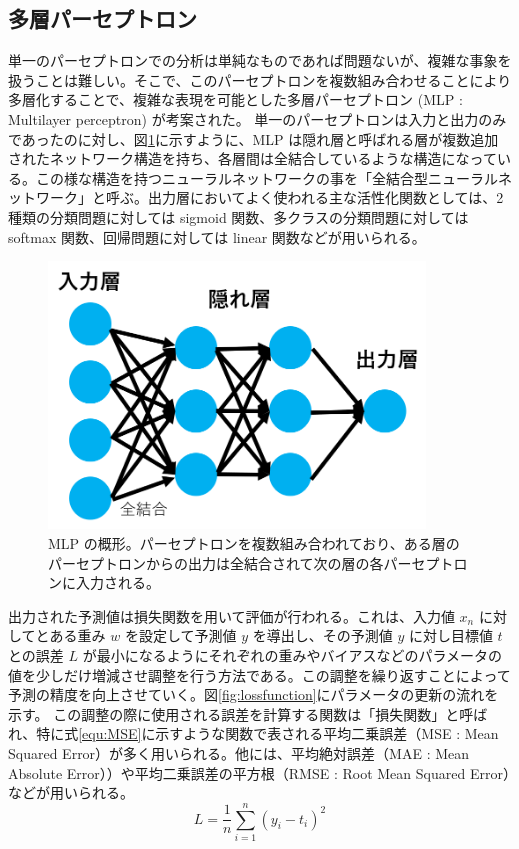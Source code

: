 \subsection{多層パーセプトロン}
単一のパーセプトロンでの分析は単純なものであれば問題ないが、複雑な事象を扱うことは難しい。そこで、このパーセプトロンを複数組み合わせることにより多層化することで、複雑な表現を可能とした多層パーセプトロン (MLP : Multilayer perceptron) が考案された。
単一のパーセプトロンは入力と出力のみであったのに対し、図\ref{fig:MLP}に示すように、MLP は隠れ層と呼ばれる層が複数追加されたネットワーク構造を持ち、各層間は全結合しているような構造になっている。この様な構造を持つニューラルネットワークの事を「全結合型ニューラルネットワーク」と呼ぶ。出力層においてよく使われる主な活性化関数としては、2種類の分類問題に対しては sigmoid 関数、多クラスの分類問題に対しては softmax 関数、回帰問題に対しては linear 関数などが用いられる。
\begin{figure}[tb]
  \centering
  \includegraphics[clip, width=10cm]{fig/4/MLP_re.png}
  \caption{MLP の概形。パーセプトロンを複数組み合われており、ある層のパーセプトロンからの出力は全結合されて次の層の各パーセプトロンに入力される。}
  \label{fig:MLP}
\end{figure}

出力された予測値は損失関数を用いて評価が行われる。これは、入力値 $x_n$ に対してとある重み $w$ を設定して予測値 $y$ を導出し、その予測値 $y$ に対し目標値 $t$ との誤差 $L$ が最小になるようにそれぞれの重みやバイアスなどのパラメータの値を少しだけ増減させ調整を行う方法である。この調整を繰り返すことによって予測の精度を向上させていく。図\ref{fig:lossfunction}にパラメータの更新の流れを示す。
この調整の際に使用される誤差を計算する関数は「損失関数」と呼ばれ、特に式\eqref{equ:MSE}に示すような関数で表される平均二乗誤差（MSE : Mean Squared Error）が多く用いられる。他には、平均絶対誤差（MAE : Mean Absolute Error））や平均二乗誤差の平方根（RMSE : Root Mean Squared Error）などが用いられる。
\begin{equation}
    L = \frac{1}{n}\sum^{n}_{i=1}(y_i-t_i)^2
    \label{equ:MSE}
\end{equation}

